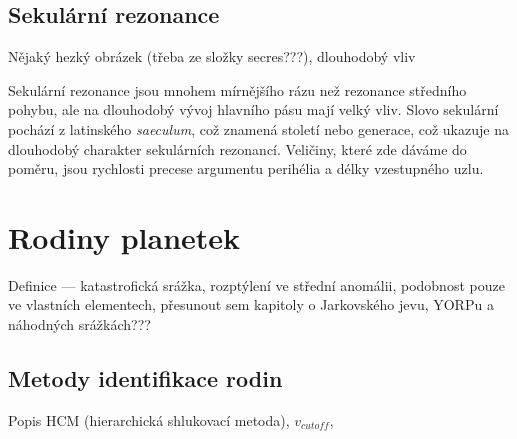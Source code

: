 \documentclass[A4paper, 12pt, oneside]{book}
\newcommand{\I}[1]{\textit{#1}}
\begin{document}
\subsection{Sekulární rezonance} 
Nějaký hezký obrázek (třeba ze složky secres???), dlouhodobý vliv

Sekulární rezonance jsou mnohem mírnějšího rázu než rezonance středního pohybu, ale na dlouhodobý vývoj hlavního pásu mají velký vliv. Slovo sekulární pochází z latinského \I{saeculum}, což znamená století nebo generace, což ukazuje na dlouhodobý charakter sekulárních rezonancí. Veličiny, které zde dáváme do poměru, jsou rychlosti precese argumentu perihélia a délky vzestupného uzlu. 
\section{Rodiny planetek}
Definice --- katastrofická srážka, rozptýlení ve střední anomálii, podobnost pouze ve vlastních elementech, přesunout sem kapitoly o Jarkovského jevu, YORPu a náhodných srážkách???
\subsection{Metody identifikace rodin}
Popis HCM (hierarchická shlukovací metoda), $v_{cutoff}$, 
\end{document}
